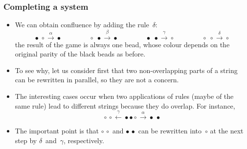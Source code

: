 \documentclass[compress,dvips,xcolor={dvipsnames},t]{beamer}
\begin{document}
\begin{frame}
  \frametitle{Completing a system}

  \begin{itemize}

    \item We can obtain confluence by adding the rule~\(\delta\):
      \begin{equation*}
        \bullet \; \circ   \xrightarrow{\alpha} \bullet\qquad\qquad
        \circ   \; \bullet \xrightarrow{\beta} \bullet\qquad\qquad
        \bullet \; \bullet \xrightarrow{\gamma}
        \circ\qquad\qquad
        \circ\; \circ \xrightarrow{\delta} \circ
      \end{equation*}
      the result of the game is always one bead, whose colour depends
      on the original parity of the black beads as before.

    \item To see why, let us consider first that two
      non\hyp{}overlapping parts of a string can be rewritten in
      parallel, so they are not a concern.

    \item The interesting cases occur when two applications of rules
      (maybe of the same rule) lead to different strings because they
      do overlap. For instance,
      \begin{equation*}
        \circ \, \circ \xleftarrow{\gamma} \bullet \bullet
        \circ \xrightarrow{\alpha} \bullet \, \bullet
      \end{equation*}

    \item The important point is that \(\circ \, \circ\) and \(\bullet
      \, \bullet\) can be rewritten into~\(\circ\) at the next step by
      \(\delta\)~and~\(\gamma\), respectively.

  \end{itemize}

\end{frame}
\end{document}
